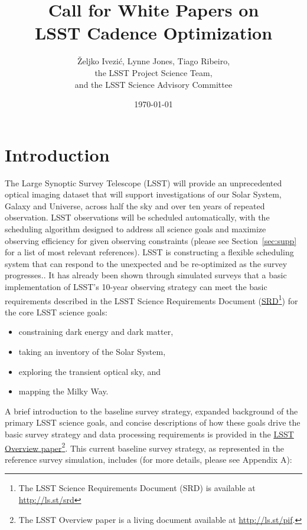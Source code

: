 \documentclass[DM,lsstdraft,toc,usenatbib]{lsstdoc}
\title[Call for LSST Cadence White Papers]{Call for White Papers on \\ LSST Cadence Optimization}
\author{\v{Z}eljko Ivezi\'{c}, Lynne Jones, Tiago Ribeiro, \\
                 the LSST Project Science Team, \\
                 and  the LSST Science Advisory Committee}
\date{\today}
\begin{document}
\maketitle


\section{Introduction} 

The Large Synoptic Survey Telescope (LSST) will provide an unprecedented optical 
imaging dataset that will support investigations of our Solar System, Galaxy and Universe, 
across half the sky and over ten years of repeated observation. LSST observations will be
scheduled automatically, with the scheduling algorithm designed to address all science goals 
and maximize observing efficiency for given observing constraints (please see Section~\ref{sec:supp}
for a list of most relevant references). LSST is constructing a 
flexible scheduling system that can respond to the unexpected and be re-optimized as the survey progresses.. 
It has already been shown through simulated surveys that a basic implementation of LSST's 
10-year observing strategy can meet the basic requirements
described in the LSST Science Requirements Document (\href{http://ls.st/srd}{SRD}\footnote{The LSST Science 
Requirements Document (SRD) is available at \href{http://ls.st/srd}{http://ls.st/srd}})
for the core LSST science goals:
\begin{itemize}
\item constraining dark energy and dark matter,
\item taking an inventory of the Solar System,
\item exploring the transient optical sky, and
\item mapping the Milky Way.
\end{itemize}
A brief introduction to the baseline survey strategy, expanded background of the primary LSST science 
goals, and concise descriptions of how these goals drive the basic survey strategy and data processing
requirements is provided in the \href{http://ls.st/pif}{LSST Overview paper}\footnote{The LSST Overview 
paper is a living document available at \href{http://ls.st/pif}{http://ls.st/pif}.}.
This current baseline survey strategy, as represented in the reference survey simulation, includes (for
more details, please see Appendix A): 
\end{document}
